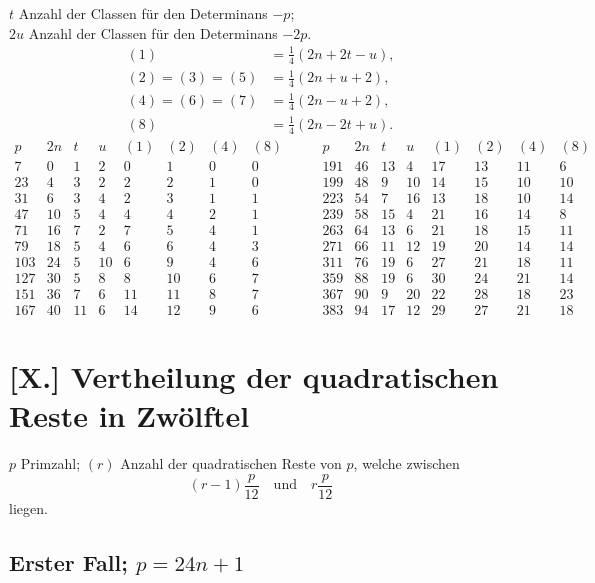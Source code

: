 \documentclass[12pt]{article}
\begin{document}
$t$ Anzahl der Classen für den Determinans $-p$;\\
$2u$ Anzahl der Classen für den Determinans $-2p$.
\[
\begin{aligned}
(1)&=\frac14(2n+2t-u),\\
(2)=(3)=(5)&=\frac14(2n+u+2),\\
(4)=(6)=(7)&=\frac14(2n-u+2),\\
(8)&=\frac14(2n-2t+u).
\end{aligned}
\]
{\scriptsize
\[
\begin{array}{r|r|r|r|r|r|r|r}
p&2n&t&u&(1)&(2)&(4)&(8)\\\hline
7&0&1&2&0&1&0&0\\
23&4&3&2&2&2&1&0\\
31&6&3&4&2&3&1&1\\
47&10&5&4&4&4&2&1\\
71&16&7&2&7&5&4&1\\
79&18&5&4&6&6&4&3\\
103&24&5&10&6&9&4&6\\
127&30&5&8&8&10&6&7\\
151&36&7&6&11&11&8&7\\
167&40&11&6&14&12&9&6
\end{array}
\qquad
\begin{array}{r|r|r|r|r|r|r|r}
p&2n&t&u&(1)&(2)&(4)&(8)\\\hline
191&46&13&4&17&13&11&6\\
199&48&9&10&14&15&10&10\\
223&54&7&16&13&18&10&14\\
239&58&15&4&21&16&14&8\\
263&64&13&6&21&18&15&11\\
271&66&11&12&19&20&14&14\\
311&76&19&6&27&21&18&11\\
359&88&19&6&30&24&21&14\\
367&90&9&20&22&28&18&23\\
383&94&17&12&29&27&21&18
\end{array}
\]
}

\section*{[X.] Vertheilung der quadratischen Reste in Zwölftel}

$p$ Primzahl; $(r)$ Anzahl der quadratischen Reste von $p$, welche zwischen
\[
(r-1)\frac{p}{12}\quad \text{und}\quad r\frac{p}{12}
\]
liegen.

\subsection*{Erster Fall; \(p=24n+1\)}
\end{document}
